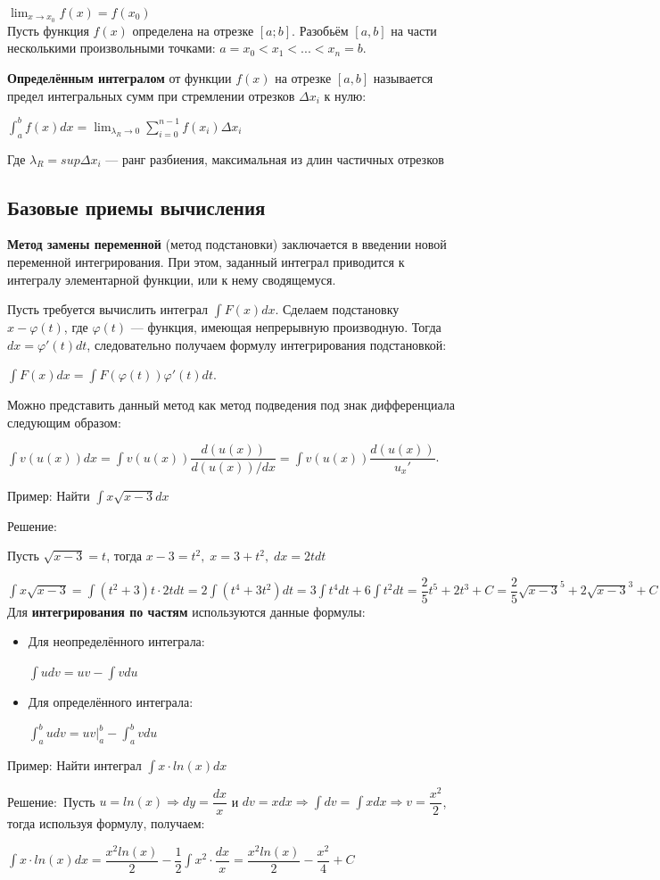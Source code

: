 \documentclass[a4paper,14pt,fleqn]{article}
\begin{document}
$\lim_{x\to x_0}f(x)=f(x_0)$\\

Пусть функция $f(x)$ определена на отрезке $[a;b]$. Разобьём $[a,b]$ на части несколькими произвольными точками: $a=x_0<x_1<...<x_n=b$.

\textbf{Определённым интегралом} от функции $f(x)$ на отрезке $[a,b]$ называется предел интегральных сумм при стремлении отрезков $\Delta x_i$ к нулю:

$\int_{a}^{b}f(x)dx=\lim_{\lambda_R\to 0}\sum_{i=0}^{n-1}f(x_i)\Delta x_i$

Где $\lambda_R=sup\Delta x_i$ --- ранг разбиения, максимальная из длин частичных отрезков

\subsection{Базовые приемы вычисления}

\textbf{Метод замены переменной} (метод подстановки) заключается в введении новой переменной интегрирования. При этом, заданный интеграл приводится к интегралу элементарной функции, или к нему сводящемуся.

Пусть требуется вычислить интеграл $\int F(x)dx$. Сделаем подстановку $x-\varphi (t)$, где $\varphi (t)$ --- функция, имеющая непрерывную производную. Тогда $dx=\varphi '(t)dt$, следовательно получаем формулу интегрирования подстановкой:

$\int F(x)dx=\int F(\varphi (t))\varphi '(t)dt$.

Можно представить данный метод как метод подведения под знак дифференциала следующим образом:

$\int v(u(x))dx=\int v(u(x))\dfrac{d(u(x))}{d(u(x))/dx}=\int v(u(x))\dfrac{d(u(x))}{u_x'}$.

Пример: Найти $\int x\sqrt{x-3}dx$

Решение:

Пусть $\sqrt{x-3}=t$, тогда $x-3=t^2,\;x=3+t^2,\;dx=2tdt$

$\int x\sqrt{x-3}=\int(t^2+3)t\cdot2tdt=2\int (t^4+3t^2)dt=3\int t^4dt+6\int t^2dt=\dfrac{2}{5}t^5+2t^3+C=\dfrac{2}{5}\sqrt{x-3}^5+2\sqrt{x-3}^3+C$\\

Для \textbf{интегрирования по частям} используются данные формулы:

\begin{itemize}
    \item Для неопределённого интеграла:

    $\int udv=uv-\int vdu$
    \item Для определённого интеграла:

    $\int_{a}^{b}udv=uv|_a^b-\int_{a}^{b}vdu$
\end{itemize}

Пример: Найти интеграл $\int x\cdot ln(x)dx$

Решение:\
Пусть $u=ln(x)\Rightarrow dy=\dfrac{dx}{x}$ и $dv=xdx\Rightarrow \int dv=\int xdx\Rightarrow v=\dfrac{x^2}{2}$, тогда используя формулу, получаем:

$\int x\cdot ln(x)dx=\dfrac{x^2ln(x)}{2}-\dfrac{1}{2}\int x^2\cdot \dfrac{dx}{x}=\dfrac{x^2ln(x)}{2}-\dfrac{x^2}{4}+C$
\end{document}
